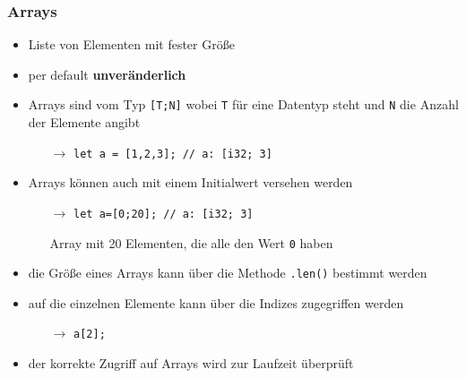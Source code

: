 \documentclass[a4paper,12pt]{article}
\begin{document}
\subsubsection*{Arrays}
	\begin{itemize}
	  \item Liste von Elementen mit fester Größe
	  \item per default \textbf{unveränderlich}
	  \item Arrays sind vom Typ \verb|[T;N]| wobei \verb|T| für eine Datentyp steht und \verb|N| die Anzahl der Elemente angibt
	  \begin{itemize}
	      \item[$\rightarrow$] \verb|let a = [1,2,3]; // a: [i32; 3]| 
	  \end{itemize}
	  \item Arrays können auch mit einem Initialwert versehen werden
	  \begin{itemize}
	      \item[$\rightarrow$] \verb|let a=[0;20]; // a: [i32; 3] |
	      \item[] Array mit 20 Elementen, die alle den Wert \verb|0| haben 
	  \end{itemize}
	  \item die Größe eines Arrays kann über die Methode \verb|.len()| bestimmt werden
	  \item auf die einzelnen Elemente kann über die Indizes zugegriffen werden
	  \begin{itemize}
	      \item[$\rightarrow$] \verb|a[2];| 
	  \end{itemize}
	  \item der korrekte Zugriff auf Arrays wird zur Laufzeit überprüft
	\end{itemize}
\end{document}
